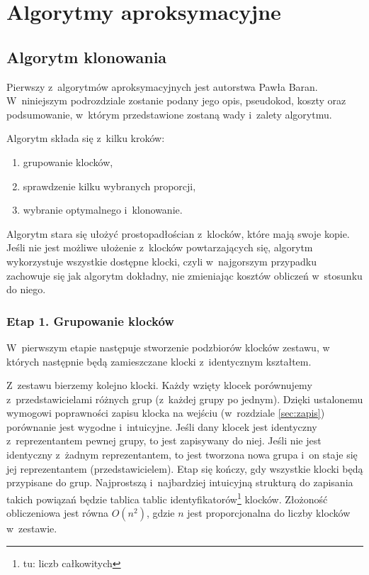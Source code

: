\documentclass[12pt]{article}
\begin{document}
\section{Algorytmy aproksymacyjne}

\subsection{Algorytm klonowania}
Pierwszy z~algorytmów aproksymacyjnych jest autorstwa Pawła Baran.
W~niniejszym podrozdziale zostanie podany jego opis, pseudokod, koszty oraz
podsumowanie, w~którym przedstawione zostaną wady i~zalety algorytmu.

Algorytm składa się z~kilku kroków:
\begin{enumerate}
	\item grupowanie klocków,
	\item sprawdzenie kilku wybranych proporcji,
	\item wybranie optymalnego i~klonowanie.
\end{enumerate}

Algorytm stara się ułożyć prostopadłościan z~klocków, które mają swoje
kopie. Jeśli nie jest możliwe ułożenie z~klocków powtarzających się,
algorytm wykorzystuje wszystkie dostępne klocki, czyli w~najgorszym
przypadku zachowuje się jak algorytm dokładny, nie zmieniając kosztów
obliczeń w~stosunku do niego.

\subsubsection{Etap 1. Grupowanie klocków}
W~pierwszym etapie następuje stworzenie podzbiorów klocków zestawu, w
których następnie będą zamieszczane klocki z~identycznym kształtem.

Z~zestawu bierzemy kolejno klocki. Każdy wzięty klocek porównujemy
z~przedstawicielami różnych grup (z~każdej grupy po jednym). Dzięki
ustalonemu wymogowi poprawności zapisu klocka na wejściu (w~rozdziale
\ref{sec:zapis}) porównanie jest wygodne i~intuicyjne. Jeśli dany klocek
jest identyczny z~reprezentantem pewnej grupy, to jest zapisywany do niej.
Jeśli nie jest identyczny z~żadnym reprezentantem, to jest tworzona nowa
grupa i~on staje się jej reprezentantem (przedstawicielem). Etap się
kończy, gdy wszystkie klocki będą przypisane do grup. Najprostszą
i~najbardziej intuicyjną strukturą do zapisania takich powiązań będzie
tablica tablic identyfikatorów\footnote{tu: liczb całkowitych} klocków.
Złożoność obliczeniowa jest równa $O(n^2)$, gdzie $n$ jest proporcjonalna
do liczby klocków w~zestawie.
\end{document}
